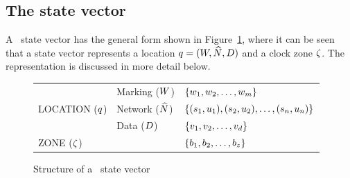 \subsection{The state vector}
A \bcandle\ state vector has the general form shown in
Figure~\ref{fig:sgsvec}, where it can be seen that a state vector
represents a location $q = (W,{\widehat{N}},{D})$ and a clock zone
${\zeta}$. The representation is discussed in more detail below.
\begin{figure}
\begin{center}
\begin{tabular}{|l|l|l|}
\hline
& Marking ($W$) & $\{{w}_1,{w}_2,\ldots,{w}_m\}$ \\ 
\cline{2-3}
LOCATION ($q$) & Network (${\widehat{N}}$) & $\{({s}_1,u_1),({s}_2,u_2),\ldots,({s}_n,u_n)\}$\\ 
\cline{2-3} 
& Data (${D}$) & $\{{v}_1,{v}_2,\ldots,{v}_d\}$  \\ 
\hline
ZONE (${\zeta}$) & \multicolumn{2}{c|}{$\{{b}_1,{b}_2,\ldots,{b}_z\}$} \\ 
\hline  
\end{tabular}
\end{center}
\caption{Structure of a \bcandle\ state vector \label{fig:sgsvec}}
\end{figure}
